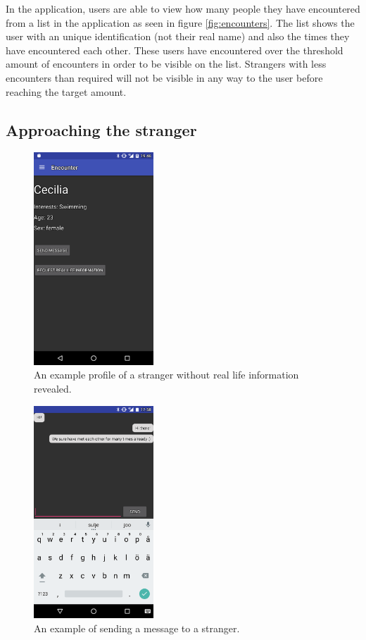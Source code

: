 In the application, users are able to view how many people they have encountered from a list in the application as seen in figure \ref{fig:encounters}. The list shows the user with an unique identification (not their real name) and also the times they have encountered each other. These users have encountered over the threshold amount of encounters in order to be visible on the list. Strangers with less encounters than required will not be visible in any way to the user before reaching the target amount.

\subsection{Approaching the stranger}

\begin{figure}[htb]
	\begin{center}
		\includegraphics[width=0.4\textwidth]{profile.png}
		\caption{An example profile of a stranger without real life information revealed.}
		\label{fig:fs_profile}
	\end{center}
\end{figure}

\begin{figure}[htb]
	\begin{center}
		\includegraphics[width=0.4\textwidth]{chat.png}
		\caption{An example of sending a message to a stranger.}
		\label{fig:fs_chat}
	\end{center}
\end{figure}

